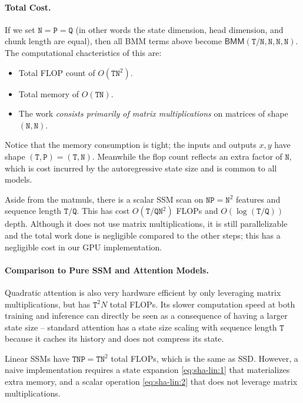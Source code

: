\paragraph{Total Cost.}
If we set $\mathtt{N} = \mathtt{P} = \mathtt{Q}$ (in other words the state dimension, head dimension, and chunk length are equal),
then all BMM terms above become $\mathsf{BMM}(\mathtt{T}/\mathtt{N}, \mathtt{N}, \mathtt{N}, \mathtt{N})$.
The computational chacteristics of this are:
\begin{itemize}
  \item Total FLOP count of $O(\mathtt{TN}^2)$.
  \item Total memory of $O(\mathtt{TN})$.
  \item The work \emph{consists primarily of matrix multiplications} on matrices of shape $(\mathtt{N}, \mathtt{N})$.
\end{itemize}
Notice that the memory consumption is tight; the inputs and outputs $x, y$ have shape $(\mathtt{T}, \mathtt{P}) = (\mathtt{T}, \mathtt{N})$.
Meanwhile the flop count reflects an extra factor of $\mathtt{N}$, which is cost incurred by the autoregressive state size and is common to all models.

Aside from the matmuls, there is a scalar SSM scan on $\mathtt{NP} = \mathtt{N}^2$ features and sequence length $\mathtt{T}/\mathtt{Q}$.
This has cost $O(\mathtt{T}/\mathtt{Q} \mathtt{N}^2)$ FLOPs and $O(\log(\mathtt{T}/\mathtt{Q}))$ depth.
Although it does not use matrix multiplications, it is still parallelizable and the total work done is negligible compared to the other steps;
this has a negligible cost in our GPU implementation.

\paragraph{Comparison to Pure SSM and Attention Models.}

Quadratic attention is also very hardware efficient by only leveraging matrix multiplications, but has $\mathtt{T}^2 N$ total FLOPs.
Its slower computation speed at both training and inference can directly be seen as a consequence of having a larger state size -- standard attention has a state size scaling with sequence length $\mathtt{T}$ because it caches its history and does not compress its state.

Linear SSMs have $\mathtt{TNP} = \mathtt{TN}^2$ total FLOPs, which is the same as SSD.
However, a naive implementation requires a state expansion \eqref{eq:sha-lin:1} that materializes extra memory,
and a scalar operation \eqref{eq:sha-lin:2} that does not leverage matrix multiplications.


